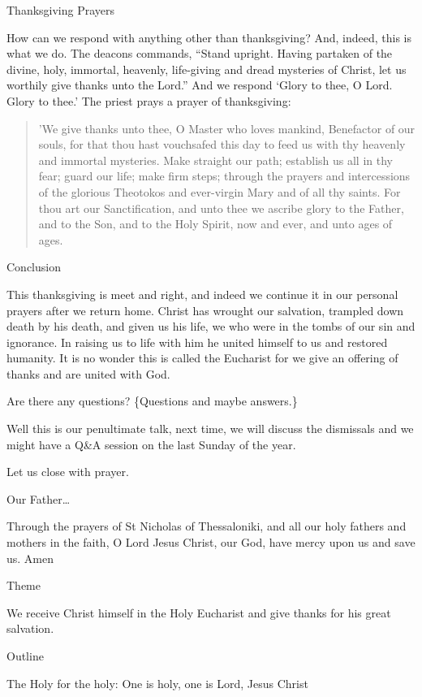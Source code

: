 \documentclass[
]{article}
\begin{document}
Thanksgiving Prayers

How can we respond with anything other than thanksgiving? And, indeed,
this is what we do. The deacons commands, ``Stand upright. Having
partaken of the divine, holy, immortal, heavenly, life-giving and dread
mysteries of Christ, let us worthily give thanks unto the Lord.'' And we
respond `Glory to thee, O Lord. Glory to thee.' The priest prays a
prayer of thanksgiving:

\begin{quote}
'We give thanks unto thee, O Master who loves mankind, Benefactor of our
souls, for that thou hast vouchsafed this day to feed us with thy
heavenly and immortal mysteries. Make straight our path; establish us
all in thy fear; guard our life; make firm steps; through the prayers
and intercessions of the glorious Theotokos and ever-virgin Mary and of
all thy saints. For thou art our Sanctification, and unto thee we
ascribe glory to the Father, and to the Son, and to the Holy Spirit, now
and ever, and unto ages of ages.
\end{quote}

Conclusion

This thanksgiving is meet and right, and indeed we continue it in our
personal prayers after we return home. Christ has wrought our salvation,
trampled down death by his death, and given us his life, we who were in
the tombs of our sin and ignorance. In raising us to life with him he
united himself to us and restored humanity. It is no wonder this is
called the Eucharist for we give an offering of thanks and are united
with God.

Are there any questions? \{Questions and maybe answers.\}

Well this is our penultimate talk, next time, we will discuss the
dismissals and we might have a Q\&A session on the last Sunday of the
year.

Let us close with prayer.

Our Father\ldots{}

Through the prayers of St Nicholas of Thessaloniki, and all our holy
fathers and mothers in the faith, O Lord Jesus Christ, our God, have
mercy upon us and save us. Amen

Theme

We receive Christ himself in the Holy Eucharist and give thanks for his
great salvation.

Outline

The Holy for the holy: One is holy, one is Lord, Jesus Christ
\end{document}

